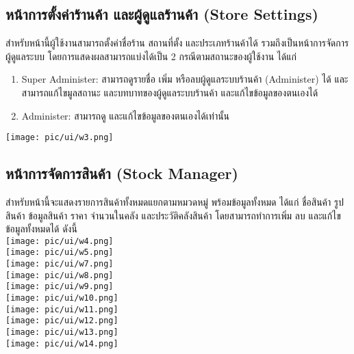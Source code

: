 \subsection{หน้าการตั้งค่าร้านค้า และผู้ดูแลร้านค้า (Store Settings)}
สำหรับหน้านี้ผู้ใช้งานสามารถตั้งค่าชื่อร้าน สถานที่ตั้ง และประเภทร้านค้าได้ รวมถึงเป็นหน้าการจัดการผู้ดูแลระบบ โดยการแสดงผลสามารถแบ่งได้เป็น 2 กรณีตามสถานะของผู้ใช้งาน ได้แก่
\begin{enumerate}
    \item Super Administer: สามารถดูรายชื่อ เพิ่ม หรือลบผู้ดูแลระบบร้านค้า (Administer) ได้ และสามารถแก้ไขมูลสถานะ และบทบาทของผู้ดูแลระบบร้านค้า และแก้ไขข้อมูลของตนเองได้
    \item Administer: สามารถดู และแก้ไขข้อมูลของตนเองได้เท่านั้น
\end{enumerate}
{
\texttt{[image: pic/ui/w3.png]}
}\\
\subsection{หน้าการจัดการสินค้า (Stock Manager)}
สำหรับหน้านี้จะแสดงรายการสินค้าทั้งหมดแยกตามหมวดหมู่ พร้อมข้อมูลทั้งหมด ได้แก่ ชื่อสินค้า รูปสินค้า ข้อมูลสินค้า ราคา จำนวนในคลัง และประวัติคลังสินค้า โดยสามารถทำการเพิ่ม ลบ และแก้ไขข้อมูลทั้งหมดได้ ดังนี้\\
{
\texttt{[image: pic/ui/w4.png]}
}\\
{
\texttt{[image: pic/ui/w5.png]}
}\\
{
\texttt{[image: pic/ui/w7.png]}
}\\
{
\texttt{[image: pic/ui/w8.png]}
}\\
{
\texttt{[image: pic/ui/w9.png]}
}\\
{
\texttt{[image: pic/ui/w10.png]}
}\\
{
\texttt{[image: pic/ui/w11.png]}
}\\
{
\texttt{[image: pic/ui/w12.png]}
}\\
{
\texttt{[image: pic/ui/w13.png]}
}\\
{
\texttt{[image: pic/ui/w14.png]}
}\\
